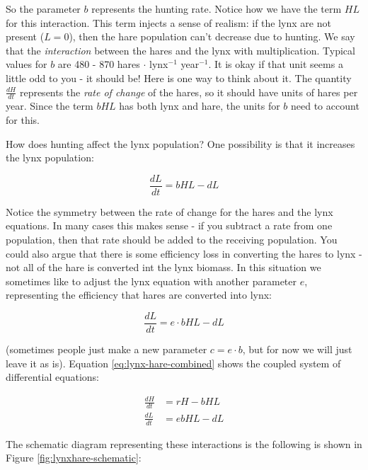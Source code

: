 \documentclass[
]{book}
\theoremstyle{definition}
\theoremstyle{definition}
\theoremstyle{definition}
\theoremstyle{remark}
\begin{document}
So the parameter \(b\) represents the hunting rate. Notice how we have the term \(HL\) for this interaction. This term injects a sense of realism: if the lynx are not present (\(L=0\)), then the hare population can't decrease due to hunting. We say that the \emph{interaction} between the hares and the lynx with multiplication. Typical values for \(b\) are 480 - 870 hares \(\cdot\) lynx\(^{-1}\) year\(^{-1}\). It is okay if that unit seems a little odd to you - it should be! Here is one way to think about it. The quantity \(\displaystyle \frac{dH}{dt}\) represents the \emph{rate of change} of the hares, so it should have units of hares per year. Since the term \(bHL\) has both lynx and hare, the units for \(b\) need to account for this.

How does hunting affect the lynx population? One possibility is that it increases the lynx population:

\begin{equation}
\frac{dL}{dt} =bHL -dL
\end{equation}

Notice the symmetry between the rate of change for the hares and the lynx equations. In many cases this makes sense - if you subtract a rate from one population, then that rate should be added to the receiving population. You could also argue that there is some efficiency loss in converting the hares to lynx - not all of the hare is converted int the lynx biomass. In this situation we sometimes like to adjust the lynx equation with another parameter \(e\), representing the efficiency that hares are converted into lynx:

\begin{equation}
\frac{dL}{dt} =e\cdot bHL -dL
\end{equation}

(sometimes people just make a new parameter \(c=e \cdot b\), but for now we will just leave it as is). Equation \eqref{eq:lynx-hare-combined} shows the coupled system of differential equations:

\begin{equation}
\begin{split}
\frac{dH}{dt} &= r H - b HL \\
\frac{dL}{dt} &=ebHL -dL
\end{split}
\label{eq:lynx-hare-combined}
\end{equation}

The schematic diagram representing these interactions is the following is shown in Figure \ref{fig:lynxhare-schematic}:
\end{document}
